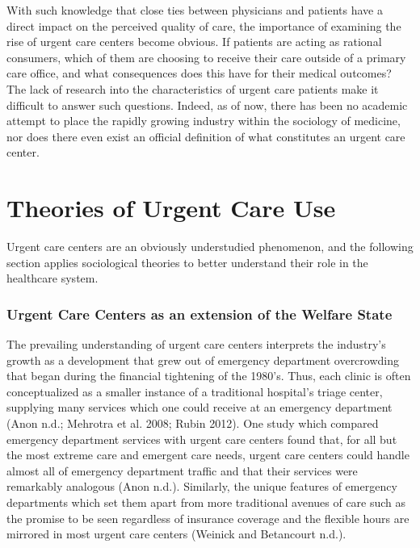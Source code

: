 \documentclass[12pt,twoside]{reedthesis}
\begin{document}
  With such knowledge that close ties between physicians and patients have
  a direct impact on the perceived quality of care, the importance of
  examining the rise of urgent care centers become obvious. If patients
  are acting as rational consumers, which of them are choosing to receive
  their care outside of a primary care office, and what consequences does
  this have for their medical outcomes? The lack of research into the
  characteristics of urgent care patients make it difficult to answer such
  questions. Indeed, as of now, there has been no academic attempt to
  place the rapidly growing industry within the sociology of medicine, nor
  does there even exist an official definition of what constitutes an
  urgent care center.
  
  \chapter*{Theories of Urgent Care
  Use}\label{theories-of-urgent-care-use}
  
  \onehalfspacing
  
  Urgent care centers are an obviously understudied phenomenon, and the
  following section applies sociological theories to better understand
  their role in the healthcare system.
  
  \subsection*{Urgent Care Centers as an extension of the Welfare
  State}\label{urgent-care-centers-as-an-extension-of-the-welfare-state}
  
  The prevailing understanding of urgent care centers interprets the
  industry's growth as a development that grew out of emergency department
  overcrowding that began during the financial tightening of the 1980's.
  Thus, each clinic is often conceptualized as a smaller instance of a
  traditional hospital's triage center, supplying many services which one
  could receive at an emergency department (Anon n.d.; Mehrotra et al.
  2008; Rubin 2012). One study which compared emergency department
  services with urgent care centers found that, for all but the most
  extreme care and emergent care needs, urgent care centers could handle
  almost all of emergency department traffic and that their services were
  remarkably analogous (Anon n.d.). Similarly, the unique features of
  emergency departments which set them apart from more traditional avenues
  of care such as the promise to be seen regardless of insurance coverage
  and the flexible hours are mirrored in most urgent care centers (Weinick
  and Betancourt n.d.).
  
\end{document}
